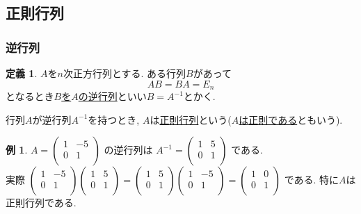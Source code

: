 \documentclass[dvipdfmx,a4paper,11pt]{article}
\theoremstyle{definition}
\newtheorem{dfn}[thm]{定義}
\newtheorem{exa}[thm]{例}
\begin{document}
\subsection{正則行列\cite[2.4節]{M}}
\subsubsection{逆行列}
\begin{tcolorbox}[
    colback = white,
    colframe = green!35!black,
    fonttitle = \bfseries,
    breakable = true]
    \begin{dfn}
$A$を$n$次正方行列とする.
 ある行列$B$があって
 $$
 AB =BA =E_{n} %
 $$
 となるとき\underline{$B$を$A$の逆行列}といい$B=A^{-1}$とかく.
 
 行列$A$が逆行列$A^{-1}$を持つとき, $A$は\underline{正則行列}という(\underline{$A$は正則である}ともいう).
  \end{dfn}
 \end{tcolorbox}
 
 \begin{exa}
 $A=
  \begin{pmatrix}
 1& -5  \\
 0& 1  \\
 \end{pmatrix} 
 $
 の逆行列は
  $A^{-1}=
  \begin{pmatrix}
 1& 5  \\
 0& 1  \\
 \end{pmatrix} 
 $
 である. \\ 
 実際
  $
  \begin{pmatrix}
 1& -5  \\
 0& 1  \\
 \end{pmatrix} 
  \begin{pmatrix}
 1& 5  \\
 0& 1  \\
 \end{pmatrix} 
=
  \begin{pmatrix}
 1& 5  \\
 0& 1  \\
 \end{pmatrix} 
   \begin{pmatrix}
 1& -5  \\
 0& 1  \\
 \end{pmatrix} 
 =
   \begin{pmatrix}
 1& 0 \\
 0& 1  \\
 \end{pmatrix} 
 $
 である.
 特に$A$は正則行列である. 
 \end{exa}
\end{document}
